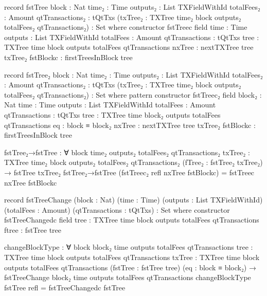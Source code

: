 \documentclass{beamer}
\begin{document}
\begin{code}
      record fstTree
        {block : Nat}
        {time₂ : Time}
        {outputs₂ : List TXFieldWithId}
        {totalFees₂ : Amount}
        {qtTransactions₂ : tQtTxs}
        (txTree₂ : TXTree time₂ block outputs₂ totalFees₂ qtTransactions₂)
        : Set where
        constructor fstTreec
        field
          {time}               : Time
          {outputs}            : List TXFieldWithId
          {totalFees}          : Amount
          {qtTransactions}     : tQtTxs
          {tree}               : TXTree time block outputs totalFees qtTransactions
          nxTree               : nextTXTree tree txTree₂
          fstBlockc            : firstTreesInBlock tree

      record fstTree₂
        {block : Nat}
        {time₂ : Time}
        {outputs₂ : List TXFieldWithId}
        {totalFees₂ : Amount}
        {qtTransactions₂ : tQtTxs}
        (txTree₂ : TXTree time₂ block outputs₂ totalFees₂ qtTransactions₂)
        : Set where
        pattern
        constructor fstTreec₂
        field
          {block₂}              : Nat
          {time}               : Time
          {outputs}            : List TXFieldWithId
          {totalFees}          : Amount
          {qtTransactions}     : tQtTxs
          {tree}               : TXTree time block₂ outputs totalFees qtTransactions
          eq                   : block ≡ block₂
          nxTree               : nextTXTree tree txTree₂
          fstBlockc            : firstTreesInBlock tree

      fstTree₂→fstTree : ∀
        {block time₂ outputs₂ totalFees₂ qtTransactions₂}
        {txTree₂ : TXTree time₂ block outputs₂ totalFees₂ qtTransactions₂}
        (fTree₂ : fstTree₂ txTree₂)
        → fstTree txTree₂
      fstTree₂→fstTree (fstTreec₂ refl nxTree fstBlockc) = fstTreec nxTree fstBlockc

      record fstTreeChange
        (block : Nat)
        (time : Time)
        (outputs : List TXFieldWithId)
        (totalFees : Amount)
        (qtTransactions : tQtTxs)
        : Set where
        constructor fstTreeChangedc
        field
          {tree}      : TXTree time block outputs totalFees qtTransactions
          ftree       : fstTree tree

      changeBlockType : ∀
        {block block₂ time outputs totalFees qtTransactions}
        {tree : TXTree time block outputs totalFees qtTransactions}
        {txTree : TXTree time block outputs totalFees qtTransactions}
        (fstTree : fstTree tree)
        (eq : block ≡ block₂)
        → fstTreeChange block₂ time outputs totalFees qtTransactions
      changeBlockType fstTree refl = fstTreeChangedc fstTree


\end{code}
\end{document}
